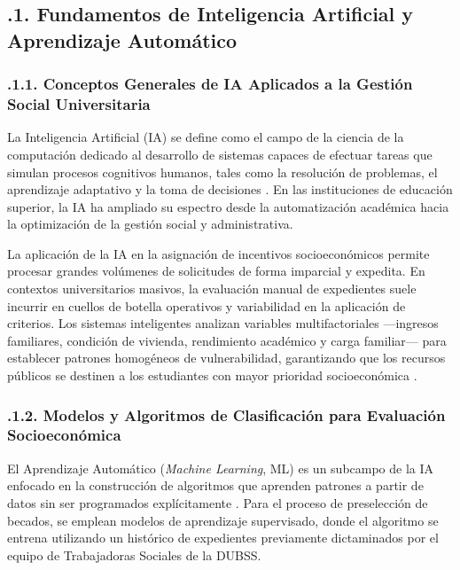 \subsection{.1. Fundamentos de Inteligencia Artificial y Aprendizaje Automático}\label{sec:ia_ml}

\subsubsection{.1.1. Conceptos Generales de IA Aplicados a la Gestión Social Universitaria}\label{sec:ia_conceptos_generales}

La Inteligencia Artificial (IA) se define como el campo de la ciencia de la computación dedicado al desarrollo de sistemas capaces de efectuar tareas que simulan procesos cognitivos humanos, tales como la resolución de problemas, el aprendizaje adaptativo y la toma de decisiones \parencite{russellnorvig2021ia}. En las instituciones de educación superior, la IA ha ampliado su espectro desde la automatización académica hacia la optimización de la gestión social y administrativa.

La aplicación de la IA en la asignación de incentivos socioeconómicos permite procesar grandes volúmenes de solicitudes de forma imparcial y expedita. En contextos universitarios masivos, la evaluación manual de expedientes suele incurrir en cuellos de botella operativos y variabilidad en la aplicación de criterios. Los sistemas inteligentes analizan variables multifactoriales —ingresos familiares, condición de vivienda, rendimiento académico y carga familiar— para establecer patrones homogéneos de vulnerabilidad, garantizando que los recursos públicos se destinen a los estudiantes con mayor prioridad socioeconómica \parencite{goodfellow2016deeplearning}.

\subsubsection{.1.2. Modelos y Algoritmos de Clasificación para Evaluación Socioeconómica}\label{sec:ia_modelos_clasificacion}

El Aprendizaje Automático (\textit{Machine Learning}, ML) es un subcampo de la IA enfocado en la construcción de algoritmos que aprenden patrones a partir de datos sin ser programados explícitamente \parencite{mitchell1997ml}. Para el proceso de preselección de becados, se emplean modelos de aprendizaje supervisado, donde el algoritmo se entrena utilizando un histórico de expedientes previamente dictaminados por el equipo de Trabajadoras Sociales de la DUBSS.

